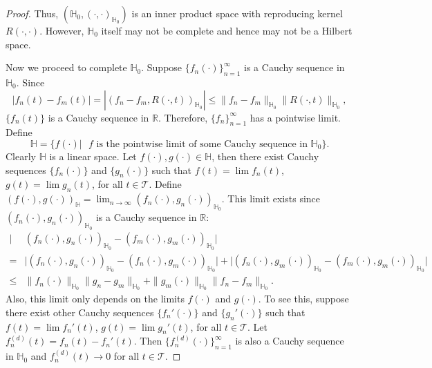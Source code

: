 \documentclass[11pt]{article}
\theoremstyle{plain}
\theoremstyle{definition}
\theoremstyle{remark}
\begin{document}
\begin{proof}
Thus, $(\mathbb H_0, (\cdot,\cdot)_{\mathbb H_0})$ is an inner product space with reproducing kernel $R(\cdot,\cdot)$.
However, $\mathbb H_0$ itself may not be complete and hence may not be a Hilbert space.

Now we proceed to complete $\mathbb H_0$.
Suppose $\{f_n(\cdot)\}_{n=1}^\infty$ is a Cauchy sequence in $\mathbb H_0$. Since
\begin{equation*}
    |f_{n}(t)-f_m(t)| =|(f_n-f_m, R(\cdot, t))_{\mathbb H_0}|
    \leq \|f_n-f_m\|_{\mathbb H_0} \|R(\cdot, t)\|_{\mathbb H_0},
\end{equation*}
$\{f_{n}(t)\}$ is a Cauchy sequence in $\mathbb R$.
Therefore, $\{f_n\}_{n=1}^\infty$ has a pointwise limit.
Define
\begin{equation*}
    \mathbb H =\{f(\cdot)| \text{  $f$ is the pointwise limit of some Cauchy sequence in $\mathbb H_0$}\}.
\end{equation*}
Clearly $\mathbb H$ is a linear space.
Let $f(\cdot),g(\cdot) \in \mathbb H$, then there exist Cauchy sequences $\{f_n(\cdot)\}$ and $\{g_n(\cdot)\}$ such that $f(t)=\lim f_n(t)$, $g(t)=\lim g_n(t)$, for all $t \in \mathcal T$.
Define $(f(\cdot),g(\cdot))_{\mathbb H}=\lim_{n\to\infty} (f_n(\cdot),g_n(\cdot))_{\mathbb H_0}$.
This limit exists since $(f_n(\cdot),g_n(\cdot))_{\mathbb H_0}$ is a Cauchy sequence in $\mathbb R$:
\begin{equation*}
    \begin{split}
    \big|
     &(f_n(\cdot),g_n(\cdot))_{\mathbb H_0}
     -
     (f_m(\cdot),g_m(\cdot))_{\mathbb H_0}
     \big|
     \\
     =&
    \big|
     (f_n(\cdot),g_n(\cdot))_{\mathbb H_0}
     -
     (f_n(\cdot),g_m(\cdot))_{\mathbb H_0}
     \big|
     +
    \big|
     (f_n(\cdot),g_m(\cdot))_{\mathbb H_0}
     -
     (f_m(\cdot),g_m(\cdot))_{\mathbb H_0}
     \big|
     \\
     \leq& \|f_n(\cdot)\|_{\mathbb H_0} \|g_n-g_m\|_{\mathbb H_0}
     +
     \|g_m(\cdot)\|_{\mathbb H_0} \|f_n-f_m\|_{\mathbb H_0}.
    \end{split}
\end{equation*}
Also, this limit only depends on the limits $f(\cdot)$ and $g(\cdot)$.
To see this, suppose there exist other Cauchy sequences $\{f_n'(\cdot)\}$ and $\{g_n'(\cdot)\}$ such that $f(t)=\lim f_n'(t)$, $g(t)=\lim g_n'(t)$, for all $t \in \mathcal T$.
Let $f^{(d)}_n(t)=f_n(t)-f_n'(t)$.
Then $\{f^{(d)}_n(\cdot)\}_{n=1}^\infty$ is also a Cauchy sequence in $\mathbb H_0$ and $f^{(d)}_n(t)\to 0$ for all $t\in \mathcal T$.

\end{proof}
\end{document}

